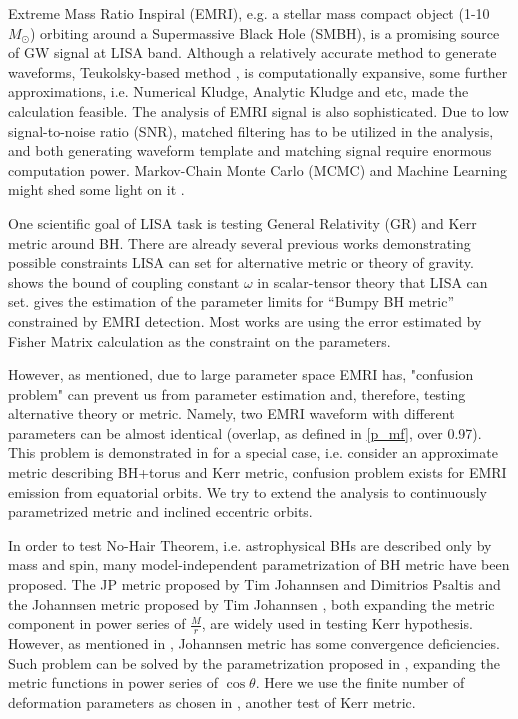\documentclass{article}
\begin{document}
Extreme Mass Ratio Inspiral (EMRI), e.g. a stellar mass compact object (1-10 $M_{\odot}$) orbiting around a Supermassive Black Hole (SMBH), is a promising source of GW signal at LISA band. %
Although a relatively accurate method to generate waveforms, Teukolsky-based method \cite{TB}\cite{review_waveform}, is computationally expansive, some further approximations, i.e. Numerical Kludge\cite{kludge}, Analytic Kludge\cite{AK} and etc, made the calculation feasible. The analysis of EMRI signal is also sophisticated. Due to low signal-to-noise ratio (SNR), matched filtering has to be utilized in the analysis, and both generating waveform template and matching signal require enormous computation power. Markov-Chain Monte Carlo (MCMC) and Machine Learning might shed some light on it \cite{MCMC} \cite{machine_learning}.

One scientific goal of LISA task is testing General Relativity (GR) and Kerr metric around BH. There are already several previous works demonstrating possible constraints LISA can set for alternative metric or theory of gravity. \cite{test_scalar-tensor} shows the bound of coupling constant $\omega$ in scalar-tensor theory that LISA can set. \cite{test_bumpyBH} gives the estimation of the parameter limits for ``Bumpy BH metric'' constrained by EMRI detection. Most works are using the error estimated by Fisher Matrix calculation as the constraint on the parameters. 

However, as \cite{07conf} mentioned, due to large parameter space EMRI has, "confusion problem" can prevent us from parameter estimation and, therefore, testing alternative theory or metric. Namely, two EMRI waveform with different parameters can be almost identical (overlap, as defined in \ref{p_mf}, over 0.97). This problem is demonstrated in \cite{majorPRD} for a special case, i.e. consider an approximate metric describing BH+torus and Kerr metric, confusion problem exists for EMRI emission from equatorial orbits. We try to extend the analysis to continuously parametrized metric and inclined eccentric orbits.

In order to test No-Hair Theorem, i.e. astrophysical BHs are described only by mass and spin, many model-independent parametrization of BH metric have been proposed. The JP metric proposed by Tim Johannsen and Dimitrios Psaltis\cite{johannsen} and the Johannsen metric proposed by Tim Johannsen \cite{johannsen_final}, both expanding the metric component in power series of $\frac{M}{r}$, are widely used in testing Kerr hypothesis. However, as mentioned in \cite{johannsen_diff}, Johannsen metric has some convergence deficiencies. Such problem can be solved by the parametrization proposed in \cite {KRZ}, expanding the metric functions in power series of $\cos \theta$. Here we use the finite number of deformation parameters as chosen in \cite{cosimoKRZ}, another test of Kerr metric.
\end{document}
